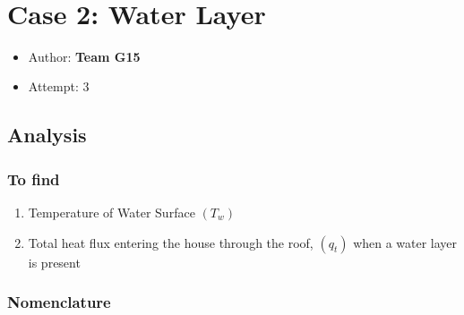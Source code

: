 \documentclass[11pt]{article}
\providecommand{\tightlist}{%
      \setlength{\itemsep}{0pt}\setlength{\parskip}{0pt}}
\begin{document}
    \begin{center}
    \end{center}
    { \hspace*{\fill} \\}
    
    \hypertarget{case-2-water-layer}{%
\section{Case 2: Water Layer}\label{case-2-water-layer}}

\begin{itemize}
\tightlist
\item
  Author: \textbf{Team G15}
\item
  Attempt: 3
\end{itemize}

    \hypertarget{analysis}{%
\subsection{Analysis}\label{analysis}}

    \hypertarget{to-find}{%
\subsubsection{To find}\label{to-find}}

\begin{enumerate}
\def\labelenumi{\arabic{enumi}.}
\tightlist
\item
  Temperature of Water Surface \((T_w)\)
\item
  Total heat flux entering the house through the roof, \((q_t)\) when a
  water layer is present
\end{enumerate}

    \hypertarget{nomenclature}{%
\subsubsection{Nomenclature}\label{nomenclature}}
\end{document}
